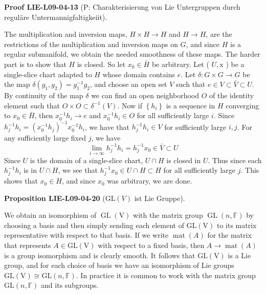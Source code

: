 \documentclass[10pt, letterpaper]{article}
\newcommand{\GL}{\mathrm{GL}}
\newcommand{\CustomHeading}[3]{%
  \par\medskip\noindent%
  \textbf{#1 #2} \textnormal{(#3)}.\enskip%
}
\newenvironment{PROP}[2]{\CustomHeading{Proposition}{#1}{#2}}{}
\newenvironment{PROOF}[2]{\CustomHeading{Proof}{#1}{#2}}{}
\begin{document}
\begin{PROOF}{LIE-L09-04-13}{P: Charakterisierung von Lie Untergruppen durch reguläre Untermannigfaltigkeiit}
The multiplication and inversion maps, $H \times H \rightarrow H$ and $H \rightarrow H$, are the restrictions of the multiplication and inversion maps on $G$, and since $H$ is a regular submanifold, we obtain the needed smoothness of these maps. The harder part is to show that $H$ is closed. So let $x_{0} \in \bar{H}$ be arbitrary. Let ( $U, \mathrm{x}$ ) be a single-slice chart adapted to $H$ whose domain contains $e$. Let $\delta: G \times G \rightarrow G$ be the map $\delta\left(g_{1}, g_{2}\right)=g_{1}^{-1} g_{2}$, and choose an open set $V$ such that $e \in V \subset \bar{V} \subset U$. By continuity of the map $\delta$ we can find an open neighborhood $O$ of the identity element such that $O \times O \subset \delta^{-1}(V)$. Now if $\left\{h_{i}\right\}$ is a sequence in $H$ converging to $x_{0} \in \bar{H}$, then $x_{0}^{-1} h_{i} \rightarrow e$ and $x_{0}^{-1} h_{i} \in O$ for all sufficiently large $i$. Since $h_{j}^{-1} h_{i}=\left(x_{0}^{-1} h_{j}\right)^{-1} x_{0}^{-1} h_{i}$, we have that $h_{j}^{-1} h_{i} \in V$ for sufficiently large $i, j$. For any sufficiently large fixed $j$, we have
$$
\lim _{i \rightarrow \infty} h_{j}^{-1} h_{i}=h_{j}^{-1} x_{0} \in \bar{V} \subset U
$$
Since $U$ is the domain of a single-slice chart, $U \cap H$ is closed in $U$. Thus since each $h_{j}^{-1} h_{i}$ is in $U \cap H$, we see that $h_{j}^{-1} x_{0} \in U \cap H \subset H$ for all sufficiently large $j$. This shows that $x_{0} \in H$, and since $x_{0}$ was arbitrary, we are done.
\end{PROOF}

\begin{PROP}{LIE-L09-04-20}{$\GL(V)$ ist Lie Gruppe}
We obtain an isomorphism of $\operatorname{GL}(\mathrm{V})$ with the matrix group $\operatorname{GL}(n, \mathbb{F})$ by choosing a basis and then simply sending each element of $\mathrm{GL}(\mathrm{V})$ to its matrix representative with respect to that basis. If we write $\operatorname{mat}(A)$ for the matrix that represents $A \in \mathrm{GL}(\mathrm{V})$ with respect to a fixed basis, then $A \rightarrow \operatorname{mat}(A)$ is a group isomorphism and is clearly smooth. It follows that $\mathrm{GL}(\mathrm{V})$ is a Lie group, and for each choice of basis we have an isomorphism of Lie groups $\mathrm{GL}(\mathrm{V}) \cong \mathrm{GL}(n, \mathbb{F})$. In practice it is common to work with the matrix group $\mathrm{GL}(n, \mathbb{F})$ and its subgroups.
\end{PROP}
\end{document}
